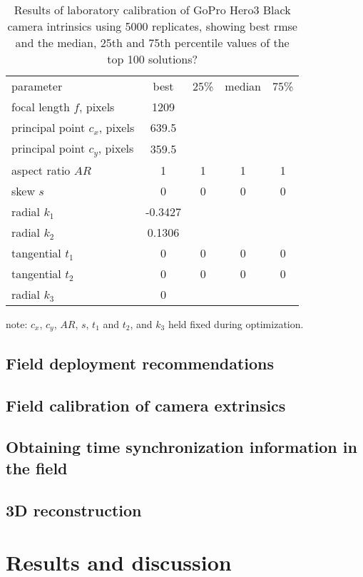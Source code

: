 \documentclass[fleqn,10pt]{wlpeerj}
\begin{document}
\begin{table}
\caption{Results of laboratory calibration of GoPro Hero3 Black camera intrinsics using 5000 replicates, showing best rmse and the median, 25th and 75th percentile values of the top 100 solutions? }
\label{tab:labcal2}
\begin{center}
\begin{tabular}{lcccc}
parameter & best & 25\% & median & 75\% \\
\cline{1-5}
focal length $f$, pixels & 1209 & & &\\
principal point $c_x$, pixels & 639.5 & & & \\
principal point $c_y$, pixels & 359.5 & & & \\
aspect ratio $AR$ & 1 & 1 & 1 & 1\\
skew $s$ & 0 & 0 & 0 & 0 \\
radial $k_1$ & -0.3427 & & & \\
radial $k_2$ & 0.1306 & & & \\
tangential $t_1$ & 0 & 0 & 0 & 0 \\
tangential $t_2$ & 0 & 0 & 0 & 0 \\
radial $k_3$ & 0 & & & \\
\end{tabular}
\end{center}
note: $c_x$, $c_y$, $AR$, $s$, $t_1$ and $t_2$, and $k_3$ held fixed during optimization.
\end{table}

\subsection*{Field deployment recommendations}
\subsection*{Field calibration of camera extrinsics}
\subsection*{Obtaining time synchronization information in the field}
\subsection*{3D reconstruction}

\section*{Results and discussion}
\end{document}
